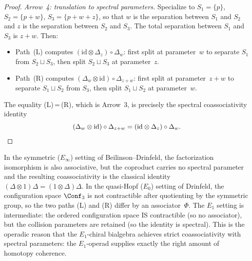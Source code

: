 \begin{proof}
\emph{Arrow~4: translation to spectral parameters.}
Specialize to $S_1 = \{p\}$, $S_2 = \{p + w\}$,
$S_3 = \{p + w + z\}$, so that $w$ is the separation between
$S_1$ and $S_2$ and $z$ is the separation between $S_2$ and
$S_3$. The total separation between $S_1$ and $S_3$ is $z+w$.
Then:
\begin{itemize}
 \item Path~(L) computes
 $(\mathrm{id} \otimes \Delta_z) \circ \Delta_w$:
 first split at parameter~$w$ to separate $S_1$ from
 $S_2 \sqcup S_3$, then split $S_2 \sqcup S_3$ at
 parameter~$z$.
 \item Path~(R) computes
 $(\Delta_w \otimes \mathrm{id}) \circ \Delta_{z+w}$:
 first split at parameter~$z+w$ to separate
 $S_1 \sqcup S_2$ from $S_3$, then split
 $S_1 \sqcup S_2$ at parameter~$w$.
\end{itemize}
The equality (L)\,=\,(R), which is Arrow~3, is precisely the
spectral coassociativity identity
\[
 (\Delta_w \otimes \mathrm{id}) \circ \Delta_{z+w}
 = (\mathrm{id} \otimes \Delta_z) \circ \Delta_w.
 \qedhere
\]
\end{proof}

\begin{remark}
\label{rem:operadic-vs-formal-coassociativity}
In the symmetric ($E_\infty$) setting of Beilinson--Drinfeld, the
factorization isomorphism is also associative, but the coproduct
carries no spectral parameter and the resulting coassociativity is
the classical identity $(\Delta \otimes 1)\Delta = (1 \otimes \Delta)\Delta$.
In the quasi-Hopf ($E_0$) setting of Drinfeld, the configuration
space $\Conf_3$ is not contractible after quotienting by the
symmetric group, so the two paths (L) and (R) differ by an
associator~$\Phi$.
The $E_1$ setting is intermediate: the ordered configuration space
IS contractible (so no associator), but the collision parameters are
retained (so the identity is spectral). This is the operadic reason
that the $E_1$-chiral bialgebra achieves strict coassociativity with
spectral parameters: the $E_1$-operad supplies exactly the right
amount of homotopy coherence.
\end{remark}

